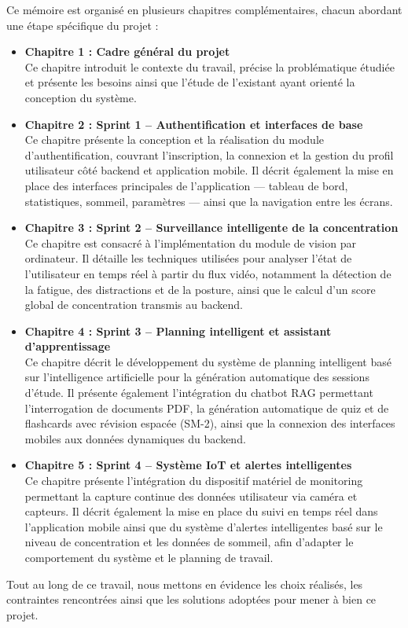 Ce mémoire est organisé en plusieurs chapitres complémentaires, chacun abordant une étape spécifique du projet :

\begin{itemize}
    \item \textbf{Chapitre 1 : Cadre général du projet} \\
    Ce chapitre introduit le contexte du travail, précise la problématique étudiée et présente les besoins ainsi que l'étude de l'existant ayant orienté la conception du système.

    \item \textbf{Chapitre 2 : Sprint 1 – Authentification et interfaces de base} \\
    Ce chapitre présente la conception et la réalisation du module d’authentification, couvrant l’inscription, la connexion et la gestion du profil utilisateur côté backend et application mobile.
    Il décrit également la mise en place des interfaces principales de l’application — tableau de bord, statistiques, sommeil, paramètres — ainsi que la navigation entre les écrans.

    \item \textbf{Chapitre 3 : Sprint 2 – Surveillance intelligente de la concentration} \\
    Ce chapitre est consacré à l’implémentation du module de vision par ordinateur.
    Il détaille les techniques utilisées pour analyser l’état de l’utilisateur en temps réel à partir du flux vidéo, notamment la détection de la fatigue, des distractions et de la posture, ainsi que le calcul d’un score global de concentration transmis au backend.

    \item \textbf{Chapitre 4 : Sprint 3 – Planning intelligent et assistant d’apprentissage} \\
    Ce chapitre décrit le développement du système de planning intelligent basé sur l’intelligence artificielle pour la génération automatique des sessions d’étude.
    Il présente également l’intégration du chatbot RAG permettant l’interrogation de documents PDF, la génération automatique de quiz et de flashcards avec révision espacée (SM-2), ainsi que la connexion des interfaces mobiles aux données dynamiques du backend.

    \item \textbf{Chapitre 5 : Sprint 4 – Système IoT et alertes intelligentes} \\
    Ce chapitre présente l’intégration du dispositif matériel de monitoring permettant la capture continue des données utilisateur via caméra et capteurs.
    Il décrit également la mise en place du suivi en temps réel dans l’application mobile ainsi que du système d’alertes intelligentes basé sur le niveau de concentration et les données de sommeil, afin d’adapter le comportement du système et le planning de travail.
\end{itemize}

Tout au long de ce travail, nous mettons en évidence les choix réalisés, les contraintes rencontrées ainsi que les solutions adoptées pour mener à bien ce projet.

\clearpage

